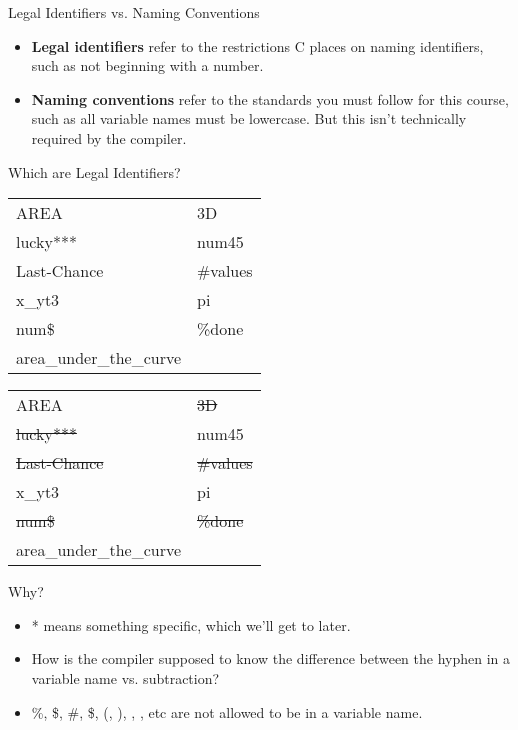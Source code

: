 \documentclass[graphics]{beamer}
\begin{document}
\begin{frame}{Legal Identifiers vs. Naming Conventions}
    \begin{itemize}
        \item \textbf{Legal identifiers} refer to the restrictions C places on naming identifiers, such as not beginning with a number.
        \item \textbf{Naming conventions} refer to the standards you must follow for this course, such as all variable names must be lowercase. But this isn't technically required by the compiler.
    \end{itemize}
\end{frame}

\begin{frame}{Which are Legal Identifiers?}
    \centering
     {
        \begin{tabular}{l l}
            AREA & 3D \\ [5pt]
            lucky*** & num45 \\ [5pt]
            Last-Chance & \#values \\ [5pt]
            x\_yt3 & pi \\ [5pt]
            num\$ & \%done \\ [5pt]
            area\_under\_the\_curve
        \end{tabular}
    }
     {
        \begin{tabular}{l l}
            AREA & \sout{3D} \\ [5pt]
            \sout{lucky***} & num45 \\ [5pt]
            \sout{Last-Chance} & \sout{\#values} \\ [5pt]
            x\_yt3 & pi \\ [5pt]
            \sout{num\$} & \sout{\%done} \\ [5pt]
            area\_under\_the\_curve
        \end{tabular}
    }
     {
        Why? \hfil
        \begin{itemize}
            \item * means something specific, which we'll get to later.
            \item How is the compiler supposed to know the difference between the hyphen in a variable name vs. subtraction?
            \item \%, \$, \#, \$, (, ), {, }, etc are not allowed to be in a variable name.
        \end{itemize}
    }
\end{frame}
\end{document}
